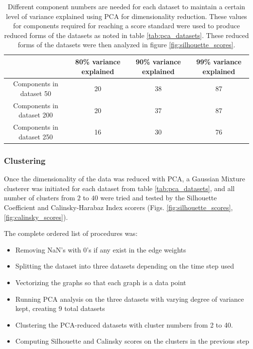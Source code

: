 \begin{table}[H]
\centering
\caption{Different component numbers are needed for each dataset to maintain a certain level of variance explained using PCA for dimensionality reduction. These values for components required for reaching a score standard were used to produce reduced forms of the datasets as noted in table \ref{tab:pca_datasets}. These reduced forms of the datasets were then analyzed in figure \ref{fig:silhouette_scores}.}
\label{tab:components_needed_for_variance}
\begin{tabular}{|c|c|c|c|}
\hline
 &  80\% variance explained &  90\% variance explained & 99\% variance explained \\ \hline
 
 Components in dataset 50 & 20 &  38&  87  \\ \hline
 Components in dataset 200 & 20 &  37&  87\\ \hline
 Components in dataset 250 & 16 &  30&  76  \\ \hline
\end{tabular}
\end{table}



\subsubsection{Clustering}
Once the dimensionality of the data was reduced with PCA, a Gaussian Mixture clusterer was initiated for each dataset from table \ref{tab:pca_datasets}, and all number of clusters from $2$ to $40$ were tried and tested by the Silhouette Coefficient and Calinsky-Harabaz Index scorers (Figs. \ref{fig:silhouette_scores}, \ref{fig:calinsky_scores}).

The complete ordered list of procedures was:
\begin{itemize}
  \item Removing NaN's with 0's if any exist in the edge weights
  \item Splitting the dataset into three datasets depending on the time step used
  \item Vectorizing the graphs so that each graph is a data point
  \item Running PCA analysis on the three datasets with varying degree of variance kept, creating 9 total datasets
  \item Clustering the PCA-reduced datasets with cluster numbers from 2 to 40.
  \item Computing Silhouette and Calinsky scores on the clusters in the previous step
\end{itemize}

